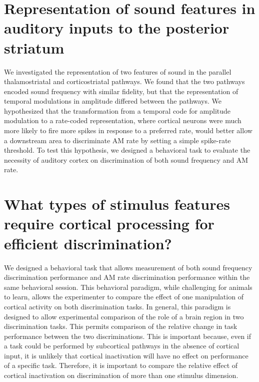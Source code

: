 \section{Representation of sound features in auditory inputs to the posterior striatum}
We investigated the representation of two features of sound in the parallel thalamostriatal and corticostriatal pathways.
%
We found that the two pathways encoded sound frequency with similar fidelity, but that the representation of temporal modulations in amplitude differed between the pathways. 
%
We hypothesized that the transformation from a temporal code for amplitude modulation to a rate-coded representation, where cortical neurons were much more likely to fire more spikes in response to a preferred rate, would better allow a downstream area to discriminate AM rate by setting a simple spike-rate threshold. 
%
To test this hypothesis, we designed a behavioral task to evaluate the necessity of auditory cortex on discrimination of both sound frequency and AM rate. 

\section{What types of stimulus features require cortical processing for efficient discrimination?}

We designed a behavioral task that allows measurement of both sound frequency discrimination performance and AM rate discrimination performance within the same behavioral session.
%
This behavioral paradigm, while challenging for animals to learn, allows the experimenter to compare the effect of one manipulation of cortical activity on both discrimination tasks. 
%
In general, this paradigm is designed to allow experimental comparison of the role of a brain region in two discrimination tasks. 
%
This permits comparison of the relative change in task performance between the two discriminations. 
%
This is important because, even if a task could be performed by subcortical pathways in the absence of cortical input, it is unlikely that cortical inactivation will have no effect on performance of a specific task.
%
Therefore, it is important to compare the relative effect of cortical inactivation on discrimination of more than one stimulus dimension. 


